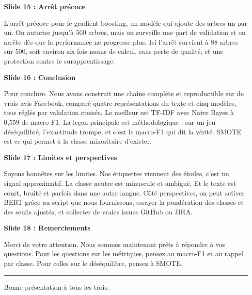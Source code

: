 \documentclass[11pt,a4paper]{article}
\newenvironment{turn}[2]%
{\begin{mdframed}[linewidth=0pt,backgroundcolor=panel,skipabove=6pt,skipbelow=6pt,
   innerleftmargin=10pt,innerrightmargin=10pt,innertopmargin=7pt,innerbottommargin=7pt,
   leftline=true,linecolor=#1,linewidth=3pt]%
 {\color{#1}\bfseries #2}\par\vspace{2pt}}
{\end{mdframed}}
\begin{document}
\begin{turn}{faical}{Slide 15 : Arrêt précoce}
L'arrêt précoce pour le gradient boosting, un modèle qui ajoute des arbres un par un. On
autorise jusqu'à 500 arbres, mais on surveille une part de validation et on arrête dès
que la performance ne progresse plus. Ici l'arrêt survient à 88 arbres sur 500, soit
environ six fois moins de calcul, sans perte de qualité, et une protection contre le
surapprentissage.
\end{turn}

\begin{turn}{faical}{Slide 16 : Conclusion}
Pour conclure. Nous avons construit une chaîne complète et reproductible sur de vrais
avis Facebook, comparé quatre représentations du texte et cinq modèles, tous réglés par
validation croisée. Le meilleur est TF-IDF avec Naive Bayes à 0,559 de macro-F1. La leçon
principale est méthodologique : sur un jeu déséquilibré, l'exactitude trompe, et c'est le
macro-F1 qui dit la vérité. SMOTE est ce qui permet à la classe minoritaire d'exister.
\end{turn}

\begin{turn}{faical}{Slide 17 : Limites et perspectives}
Soyons honnêtes sur les limites. Nos étiquettes viennent des étoiles, c'est un signal
approximatif. La classe neutre est minuscule et ambiguë. Et le texte est court, bruité et
parfois dans une autre langue. Côté perspectives, on peut activer BERT grâce au script
que nous fournissons, essayer la pondération des classes et des seuils ajustés, et
collecter de vraies issues GitHub ou JIRA.
\end{turn}

\begin{turn}{faical}{Slide 18 : Remerciements}
Merci de votre attention. Nous sommes maintenant prêts à répondre à vos questions. Pour
les questions sur les métriques, pensez au macro-F1 et au rappel par classe. Pour celles
sur le déséquilibre, pensez à SMOTE.
\end{turn}

\vspace{0.3cm}
{\color{accent}\rule{\linewidth}{1.2pt}}
\begin{center}\small\textcolor{primary}{Bonne présentation à tous les trois.}\end{center}
\end{document}
